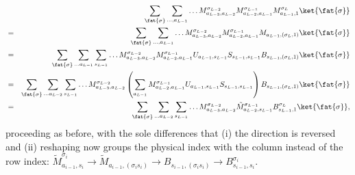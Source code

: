 \begin{eqnarray}
& & \sum_{\fat{\sigma}} \sum_{\ldots,a_{L-1}}  \ldots M^{\sigma_{L-2}}_{a_{L-3},a_{L-2}} M^{\sigma_{L-1}}_{a_{L-2},a_{L-1}} M^{\sigma_{L}}_{a_{L-1},1}  \ket{\fat{\sigma}} \nonumber \\
&=& \sum_{\fat{\sigma}} \sum_{\ldots,a_{L-1}}  \ldots M^{\sigma_{L-2}}_{a_{L-3},a_{L-2}} M^{\sigma_{L-1}}_{a_{L-2},a_{L-1}} M_{a_{L-1},(\sigma_{L},1)}  \ket{\fat{\sigma}} \nonumber \\
&=&  \sum_{\fat{\sigma}} \sum_{\ldots a_{L-1}} \sum_{s_{L-1}}  \ldots M^{\sigma_{L-2}}_{a_{L-3},a_{L-2}} M^{\sigma_{L-1}}_{a_{L-2},a_{L-1}} 
U_{a_{L-1},s_{L-1}} S_{s_{L-1},s_{L-1}} B_{s_{L-1},(\sigma_L,1)}   \ket{\fat{\sigma}} \nonumber \\
&=& \sum_{\fat{\sigma}} \sum_{\ldots a_{L-2}} \sum_{s_{L-1}} 
\ldots M^{\sigma_{L-2}}_{a_{L-3},a_{L-2}} \left( \sum_{a_{L-1}} M^{\sigma_{L-1}}_{a_{L-2},a_{L-1}} U_{a_{L-1},s_{L-1}} S_{s_{L-1},s_{L-1}}\right) 
B_{s_{L-1},(\sigma_L,1)}   \ket{\fat{\sigma}} \nonumber \\
&=& \sum_{\fat{\sigma}} \sum_{\ldots a_{L-2}} \sum_{s_{L-1}}
\ldots M^{\sigma_{L-2}}_{a_{L-3},a_{L-2}} \tilde{M}^{\sigma_{L-1}}_{a_{L-2},s_{L-1}} B^{\sigma_L}_{s_{L-1},1}   \ket{\fat{\sigma}} ,
\end{eqnarray}
proceeding as before, with the sole differences that (i) the direction is reversed and (ii) reshaping now groups the physical index with the column instead of the row index: $\tilde{M}^{\sigma_i}_{a_{i-1},s_{i}} \rightarrow \tilde{M}_{a_{i-1},(\sigma_i s_i)} \rightarrow B_{s_{i-1},(\sigma_i s_i)} \rightarrow B^{\sigma_i}_{s_{i-1},s_i}$. 
    
    
